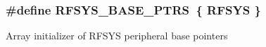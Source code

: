 \subsubsection[{\texorpdfstring{R\+F\+S\+Y\+S\+\_\+\+B\+A\+S\+E\+\_\+\+P\+T\+RS}{RFSYS_BASE_PTRS}}]{\setlength{\rightskip}{0pt plus 5cm}\#define R\+F\+S\+Y\+S\+\_\+\+B\+A\+S\+E\+\_\+\+P\+T\+RS~\{ {\bf R\+F\+S\+YS} \}}\hypertarget{group__RFSYS__Peripheral__Access__Layer_ga59f6caa8732744ac3a9f91828ec2daa1}{}\label{group__RFSYS__Peripheral__Access__Layer_ga59f6caa8732744ac3a9f91828ec2daa1}
Array initializer of R\+F\+S\+YS peripheral base pointers 